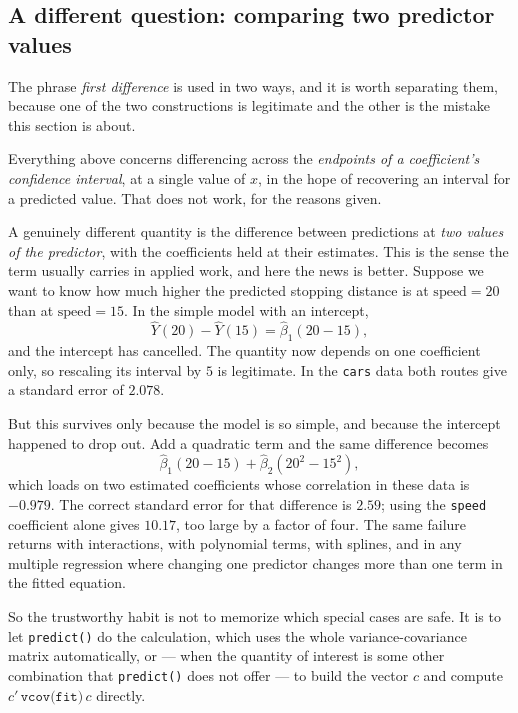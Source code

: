 \documentclass[11pt]{report}
\begin{document}
\subsection{A different question: comparing two predictor values}

The phrase \emph{first difference} is used in two ways, and it is worth separating them, because one of the two constructions is legitimate and the other is the mistake this section is about.

Everything above concerns differencing across the \emph{endpoints of a coefficient's confidence interval}, at a single value of \(x\), in the hope of recovering an interval for a predicted value. That does not work, for the reasons given.

A genuinely different quantity is the difference between predictions at \emph{two values of the predictor}, with the coefficients held at their estimates. This is the sense the term usually carries in applied work, and here the news is better. Suppose we want to know how much higher the predicted stopping distance is at \(\text{speed}=20\) than at \(\text{speed}=15\). In the simple model with an intercept,
\[
\widehat{Y}(20)-\widehat{Y}(15)
=
\widehat{\beta}_1(20-15),
\]
and the intercept has cancelled. The quantity now depends on one coefficient only, so rescaling its interval by \(5\) is legitimate. In the \texttt{cars} data both routes give a standard error of \(2.078\).

But this survives only because the model is so simple, and because the intercept happened to drop out. Add a quadratic term and the same difference becomes
\[
\widehat{\beta}_1(20-15)+\widehat{\beta}_2(20^2-15^2),
\]
which loads on two estimated coefficients whose correlation in these data is \(-0.979\). The correct standard error for that difference is \(2.59\); using the \texttt{speed} coefficient alone gives \(10.17\), too large by a factor of four. The same failure returns with interactions, with polynomial terms, with splines, and in any multiple regression where changing one predictor changes more than one term in the fitted equation.

So the trustworthy habit is not to memorize which special cases are safe. It is to let \texttt{predict()} do the calculation, which uses the whole variance-covariance matrix automatically, or --- when the quantity of interest is some other combination that \texttt{predict()} does not offer --- to build the vector \(c\) and compute \(c'\,\texttt{vcov(fit)}\,c\) directly.
\end{document}
